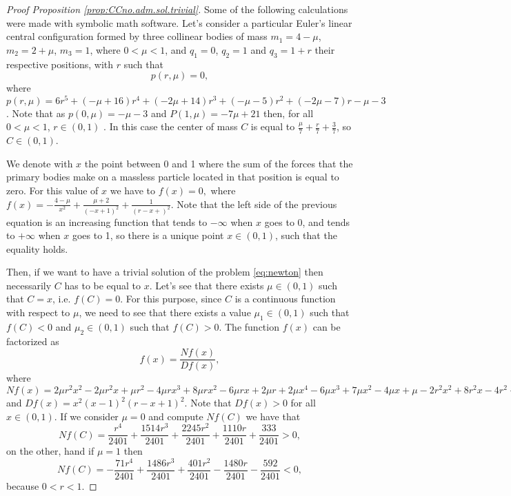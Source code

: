 \documentclass[twoside]{article}
\theoremstyle{remark}
\begin{document}
\begin{proof}[Proof Proposition \ref{prop:CCno.adm.sol.trivial}]
Some of the following calculations were made with symbolic math software. Let's  consider a particular Euler's linear central configuration formed by three collinear bodies of mass $m_1 = 4-\mu$, $m_2 = 2 + \mu$, $m_3 = 1$, where $0<\mu<1$, and $q_1 = 0$, $q_2 = 1$ and $q_3 = 1 + r$ their respective positions, with $r$ such that
\[ p(r,\mu)=0,\]
where $p(r,\mu)=6 r^{5} +\left(- \mu + 16\right) r^{4}  +  \left(- 2 \mu + 14\right) r^{3}+ \left(- \mu - 5\right)  r^{2}+\left(- 2 \mu - 7\right) r - \mu - 3$. Note that as $p(0,\mu)=-\mu-3$ and $P(1,\mu)=-7\mu+21$ then, for all $0<\mu<1$, $r\in (0,1)$ .
In this case the center of mass $C$ is equal to $\frac{\mu}{7} + \frac{r}{7} + \frac{3}{7}$, so $C\in (0,1)$. 

We denote with $x$ the point between 0 and 1 where the sum of the forces that the primary bodies make on a massless particle located in that position is equal to zero. For this value of $x$ we have to
$f(x)=0,$ where $f(x)= - \frac{4-\mu }{x^{2}}+\frac{\mu + 2}{\left(- x + 1\right)^{2}} + \frac{1}{\left(r - x + \right)^{2}}$.
Note that the left side of the previous equation is an increasing function that tends to $-\infty$ when $x$ goes to 0, and tends to $+\infty$ when $x$ goes to 1, so there is a unique point $x\in (0,1)$, such that the equality holds.

Then, if we want to have a trivial solution of the problem \eqref{eq:newton} then necessarily $C$ has to be equal to $x$. Let's see that there exists $ \mu \in (0,1) $ such that $ C = x $, i.e. $f(C)=0$. For this purpose, since $C$ is a continuous function with respect to $\mu$,  we need to see that there exists a value $\mu_1\in (0,1)$ such that $f (C) <0$  and   $ \mu_2\in (0,1) $ such that $ f (C)> 0 $.  The function $f(x)$ can be factorized as $$f(x)=\frac{Nf(x)}{Df(x)},$$ where $Nf(x)=2 \mu r^{2} x^{2} - 2 \mu r^{2} x + \mu r^{2} - 4 \mu r x^{3} + 8 \mu r x^{2} - 6 \mu r x + 2 \mu r + 2 \mu x^{4} - 6 \mu x^{3} + 7 \mu x^{2} - 4 \mu x + \mu - 2 r^{2} x^{2} + 8 r^{2} x - 4 r^{2} + 4 r x^{3} - 20 r x^{2} + 24 r x - 8 r - x^{4} + 10 x^{3} - 21 x^{2} + 16 x - 4$ and $Df(x)=x^{2} \left(x - 1\right)^{2} \left(r - x + 1\right)^{2}$. Note that  $Df(x)>0$ for all $x\in (0,1)$. If we consider $\mu=0$ and compute $Nf(C)$ we have that
\[Nf(C)=\frac{r^{4}}{2401} + \frac{1514 r^{3}}{2401} + \frac{2245 r^{2}}{2401} + \frac{1110 r}{2401} + \frac{333}{2401}>0,\]
on the other, hand if  $\mu=1$ then
\[Nf(C)=- \frac{71 r^{4}}{2401} + \frac{1486 r^{3}}{2401} + \frac{401 r^{2}}{2401} - \frac{1480 r}{2401} - \frac{592}{2401}<0,\]
because $0<r<1$. 
\end{proof}
\end{document}
